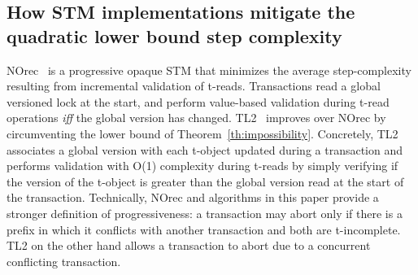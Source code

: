 \subsection{How STM implementations mitigate the quadratic lower bound step complexity}
NOrec~\cite{norec} is a progressive opaque STM that minimizes the average step-complexity resulting from incremental 
validation of t-reads. Transactions read a global versioned lock at the start, and perform value-based validation
during t-read operations \emph{iff} the global version has changed.
TL2~\cite{DSS06} improves over NOrec by circumventing the lower bound
of Theorem~\ref{th:impossibility}. Concretely, TL2 associates a global version with each t-object updated during
a transaction and performs validation with O(1) complexity during t-reads by simply verifying if the version
of the t-object is greater than the global version read at the start of the transaction. Technically,
NOrec and algorithms in this paper provide a stronger definition of progressiveness: a transaction may abort
only if there is a prefix in which it conflicts with another transaction and both are t-incomplete. TL2 on the other hand allows
a transaction to abort due to a concurrent conflicting transaction.

